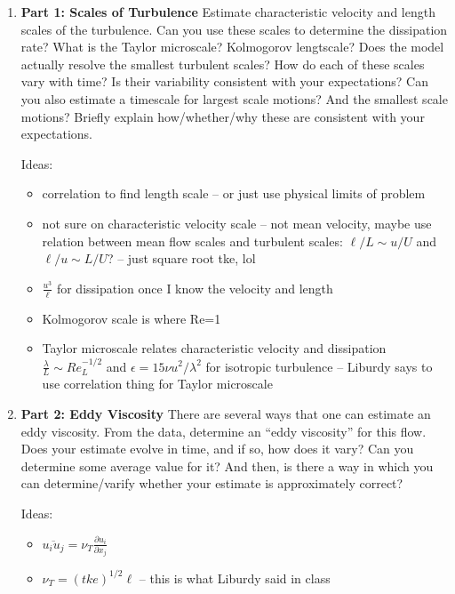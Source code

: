 \documentclass[11pt]{article}
\begin{document}
\begin{enumerate}

    \item \textbf{Part 1: Scales of Turbulence} Estimate characteristic velocity and length scales of the turbulence. Can you use these scales to determine the dissipation rate? What is the Taylor microscale? Kolmogorov lengtscale? Does the model actually resolve the smallest turbulent scales? How do each of these scales vary with time? Is their variability consistent with your expectations? Can you also estimate a timescale for largest scale motions? And the smallest scale motions? Briefly explain how/whether/why these are consistent with your expectations.\par
    
    Ideas:
    \begin{itemize}
        \item correlation to find length scale -- or just use physical limits of problem
        \item not sure on characteristic velocity scale -- not mean velocity, maybe use relation between mean flow scales and turbulent scales: $\ell/L \sim u/U$ and $\ell/u \sim L/U$? -- just square root tke, lol
        \item $\frac{u^3}{\ell}$ for dissipation once I know the velocity and length
        \item Kolmogorov scale is where Re=1
        \item Taylor microscale relates characteristic velocity and dissipation $\frac{\lambda}{L} \sim Re_L^{-1/2}$ and $\epsilon = 15\nu u^2 / \lambda^2$ for isotropic turbulence -- Liburdy says to use correlation thing for Taylor microscale
    \end{itemize}
    

    \item \textbf{Part 2: Eddy Viscosity} There are several ways that one can estimate an eddy viscosity. From the data, determine an ``eddy viscosity'' for this flow. Does your estimate evolve in time, and if so, how does it vary? Can you determine some average value for it? And then, is there a way in which you can determine/varify whether your estimate is approximately correct?
    
    Ideas:
    \begin{itemize}
        \item $\overline{u_i u_j} = \nu_T \frac{\partial u_i}{\partial x_j}$
        \item $\nu_T = \left( tke \right)^{1/2} \ell$ -- this is what Liburdy said in class
    \end{itemize}
    


\end{enumerate}
\end{document}
